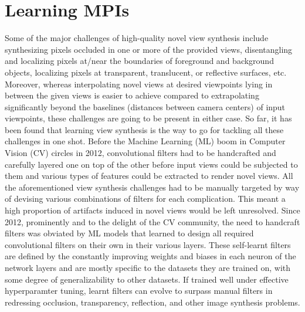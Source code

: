 \section{Learning MPIs}\label{sec:approach} 

Some of the major challenges of high-quality novel view synthesis include synthesizing pixels occluded in one or more of the provided views, disentangling and localizing pixels at/near the boundaries of foreground and background objects, localizing pixels at transparent, translucent, or reflective surfaces, etc. Moreover, whereas interpolating novel views at desired viewpoints lying in between the given views is easier to achieve compared to extrapolating significantly beyond the baselines (distances between camera centers) of input viewpoints, these challenges are going to be present in either case. So far, it has been found that learning view synthesis is the way to go for tackling all these challenges in one shot. Before the Machine Learning (ML) boom in Computer Vision (CV) circles in 2012, convolutional filters had to be handcrafted and carefully layered one on top of the other before input views could be subjected to them and various types of features could be extracted to render novel views. All the aforementioned view synthesis challenges had to be manually targeted by way of devising various combinations of filters for each complication. This meant a high proportion of artifacts induced in novel views would be left unresolved. Since 2012, prominently and to the delight of the CV community, the need to handcraft filters was obviated by ML models that learned to design all required convolutional filters on their own in their various layers. These self-learnt filters are defined by the constantly improving weights and biases in each neuron of the network layers and are mostly specific to the datasets they are trained on, with some degree of generalizability to other datasets. If trained well under effective hyperparamter tuning, learnt filters can evolve to surpass manual filters in redressing occlusion, transparency, reflection, and other image synthesis problems.

